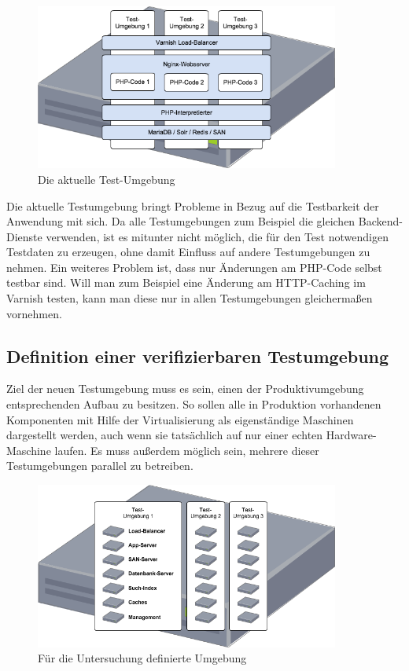\begin{figure}[!ht]
  \begin{center}
    \includegraphics[width=10cm]{bilder/Aktuelle-Testumgebung.png}
    \caption{Die aktuelle Test-Umgebung}
  \end{center}
\end{figure}

Die aktuelle Testumgebung bringt Probleme in Bezug auf die Testbarkeit der Anwendung mit sich. Da alle Testumgebungen zum Beispiel die gleichen Backend-Dienste verwenden, ist es mitunter nicht möglich, die für den Test notwendigen Testdaten zu erzeugen, ohne damit Einfluss auf andere Testumgebungen zu nehmen. Ein weiteres Problem ist, dass nur Änderungen am PHP-Code selbst testbar sind. Will man zum Beispiel eine Änderung am HTTP-Caching im Varnish testen, kann man diese nur in allen Testumgebungen gleichermaßen vornehmen.

\subsection{Definition einer verifizierbaren Testumgebung}

Ziel der neuen Testumgebung muss es sein, einen der Produktivumgebung entsprechenden Aufbau zu besitzen. So sollen alle in Produktion vorhandenen Komponenten mit Hilfe der Virtualisierung als eigenständige Maschinen dargestellt werden, auch wenn sie tatsächlich auf nur einer echten Hardware-Maschine laufen. Es muss außerdem möglich sein, mehrere dieser Testumgebungen parallel zu betreiben.

\begin{figure}[!ht]
  \begin{center}
    \includegraphics[width=10cm]{bilder/Untersuchungs-Umgebung.png}
    \caption{Für die Untersuchung definierte Umgebung}
  \end{center}
\end{figure}

